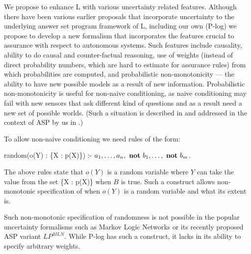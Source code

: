 We propose to enhance L with various uncertainty related features. Although there have been various earlier proposals that incorporate uncertainty to the underlying answer set program framework of L, including our own (P-log) we propose to develop a new formalism that incorporates the features crucial to assurance with respect to autonomous systems. Such features include causality, ability to do causal and counter-factual reasoning, use of weights (instead of direct probability numbers, which are hard to estimate for assurance rules) from which probabilities are computed, and probabilistic non-monotonicity — the ability to have new possible models as a result of new information. Probabilistic non-monotonicity is useful for non-naive conditioning, as naive conditioning may fail with new sensors that ask different kind of questions and as a result need a new set of possible worlds. (Such a situation is described in \cite{halpern2003} and addressed in the context of ASP by us in \cite{baral2007}.) 

To allow non-naive conditioning we need rules of the form:

random(o(Y) : \{X : p(X)\}) :- 
$a_1, \ldots , a_n, \ {\bf not} \ b_1, \ldots, \ {\bf not} \ b_m$. 

The above rules state that $o(Y)$ is a random variable where $Y$ can take the value from the set \{X : p(X)\} when $B$ is true. Such a construct allows non-monotonic specification of when $o(Y)$ is a random variable and what its extent is. 

Such non-monotonic specification of randomness is not possible in the popular uncertainty formalisms such as Markov Logic Networks or its recently proposed ASP variant $LP^{MLN}$. While P-log has such a construct, it lacks in its ability to specify arbitrary weights. 



